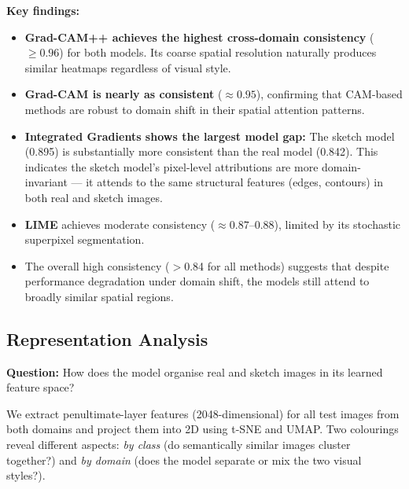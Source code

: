\documentclass[12pt, a4paper]{article}
\begin{document}
\textbf{Key findings:}
\begin{itemize}[leftmargin=*]
    \item \textbf{Grad-CAM++ achieves the highest cross-domain consistency}
          ($\geq 0.96$) for both models.  Its coarse spatial resolution
          naturally produces similar heatmaps regardless of visual style.
    \item \textbf{Grad-CAM is nearly as consistent} ($\approx 0.95$),
          confirming that CAM-based methods are robust to domain shift in
          their spatial attention patterns.
    \item \textbf{Integrated Gradients shows the largest model gap:} The
          sketch model (0.895) is substantially more consistent than the real
          model (0.842).  This indicates the sketch model's pixel-level
          attributions are more domain-invariant --- it attends to the same
          structural features (edges, contours) in both real and sketch images.
    \item \textbf{LIME} achieves moderate consistency ($\approx 0.87$--$0.88$),
          limited by its stochastic superpixel segmentation.
    \item The overall high consistency ($>$0.84 for all methods) suggests that
          despite performance degradation under domain shift, the models still
          attend to broadly similar spatial regions.
\end{itemize}


\subsection{Representation Analysis}
\label{sec:representations}

\textbf{Question:} How does the model organise real and sketch images in its
learned feature space?

We extract penultimate-layer features (2048-dimensional) for all test images
from both domains and project them into 2D using t-SNE and UMAP.  Two
colourings reveal different aspects: \emph{by class} (do semantically similar
images cluster together?) and \emph{by domain} (does the model separate or
mix the two visual styles?).
\end{document}
